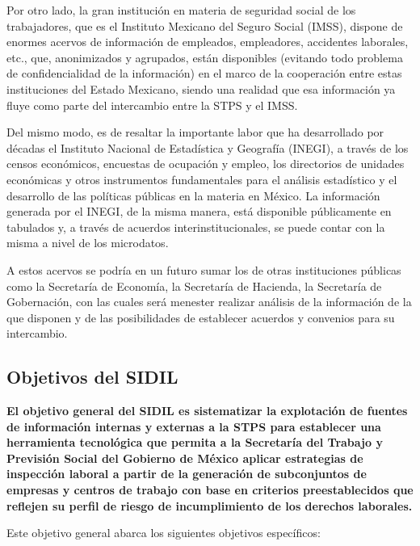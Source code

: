\documentclass[
]{article}
\begin{document}
Por otro lado, la gran institución en materia de seguridad social de los trabajadores, que es el Instituto Mexicano del Seguro Social (IMSS), dispone de enormes acervos de información de empleados, empleadores, accidentes laborales, etc., que, anonimizados y agrupados, están disponibles (evitando todo problema de confidencialidad de la información) en el marco de la cooperación entre estas instituciones del Estado Mexicano, siendo una realidad que esa información ya fluye como parte del intercambio entre la STPS y el IMSS.

Del mismo modo, es de resaltar la importante labor que ha desarrollado por décadas el Instituto Nacional de Estadística y Geografía (INEGI), a través de los censos económicos, encuestas de ocupación y empleo, los directorios de unidades económicas y otros instrumentos fundamentales para el análisis estadístico y el desarrollo de las políticas públicas en la materia en México. La información generada por el INEGI, de la misma manera, está disponible públicamente en tabulados y, a través de acuerdos interinstitucionales, se puede contar con la misma a nivel de los microdatos.

A estos acervos se podría en un futuro sumar los de otras instituciones públicas como la Secretaría de Economía, la Secretaría de Hacienda, la Secretaría de Gobernación, con las cuales será menester realizar análisis de la información de la que disponen y de las posibilidades de establecer acuerdos y convenios para su intercambio.

\hypertarget{introobjetivos}{%
\subsection{Objetivos del SIDIL}\label{introobjetivos}}

\textbf{El objetivo general del SIDIL es sistematizar la explotación de fuentes de información internas y externas a la STPS para establecer una herramienta tecnológica que permita a la Secretaría del Trabajo y Previsión Social del Gobierno de México aplicar estrategias de inspección laboral a partir de la generación de subconjuntos de empresas y centros de trabajo con base en criterios preestablecidos que reflejen su perfil de riesgo de incumplimiento de los derechos laborales.}

Este objetivo general abarca los siguientes objetivos específicos:
\end{document}
